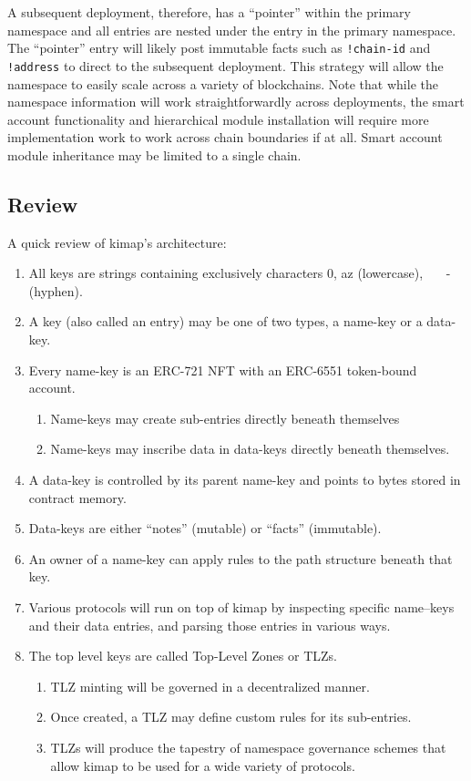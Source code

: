 \documentclass[runningheads]{llncs}
\begin{document}
A subsequent deployment, therefore, has a ``pointer'' within the primary namespace and all entries are nested under the entry in the primary namespace.
The ``pointer'' entry will likely post immutable facts such as \verb|!chain-id| and \verb|!address| to direct to the subsequent deployment.
This strategy will allow the namespace to easily scale across a variety of blockchains.
Note that while the namespace information will work straightforwardly across deployments, the smart account functionality and hierarchical module installation will require more implementation work to work across chain boundaries if at all.
Smart account module inheritance may be limited to a single chain.

\subsection{Review}
\label{sec:kimapreview}

A quick review of kimap's architecture:

\begin{enumerate}
    \item All keys are strings containing exclusively characters 0, a\textendash z (lowercase),    - (hyphen).
    \item A key (also called an entry) may be one of two types, a name-key or a data-key.
    \item Every name-key is an ERC-721 NFT with an ERC-6551 token-bound account.
        \begin{enumerate}
            \item Name-keys may create sub-entries directly beneath themselves
            \item Name-keys may inscribe data in data-keys directly beneath themselves.
        \end{enumerate}
    \item A data-key is controlled by its parent name-key and points to bytes stored in contract memory.
    \item Data-keys are either ``notes'' (mutable) or ``facts'' (immutable).
    \item An owner of a name-key can apply rules to the path structure beneath that key.
    \item Various protocols will run on top of kimap by inspecting specific name–keys and their data entries, and parsing those entries in various ways.
    \item The top level keys are called Top-Level Zones or TLZs.
        \begin{enumerate}
            \item TLZ minting will be governed in a decentralized manner.
            \item Once created, a TLZ may define custom rules for its sub-entries.
            \item TLZs will produce the tapestry of namespace governance schemes that allow kimap to be used for a wide variety of protocols.
        \end{enumerate}
\end{enumerate}
\end{document}
